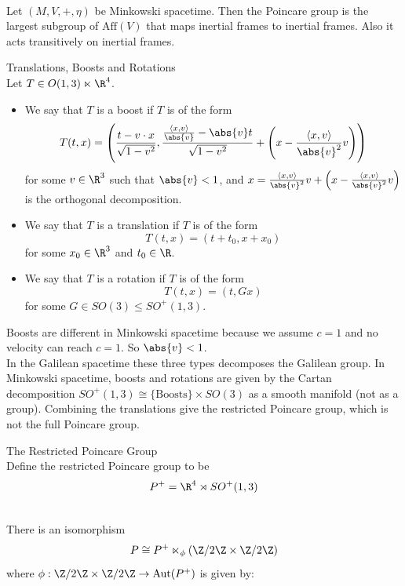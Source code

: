 \documentclass[a4paper]{article}
\begin{document}
\begin{prp}{}{}\\
Let $(M,V,+,\eta)$ be Minkowski spacetime. Then the Poincare group is the largest subgroup of $\text{Aff}(V)$ that maps inertial frames to inertial frames. Also it acts transitively on inertial frames. 
\end{prp}

\begin{defn}{Translations, Boosts and Rotations}{}\\
Let $T\in O(1,3)\ltimes\R^4$. 
\begin{itemize}
\item We say that $T$ is a boost if $T$ is of the form $$T(t,x)=\left(\frac{t-v\cdot x}{\sqrt{1-v^2}},\frac{\frac{\langle x,v\rangle}{\abs{v}}-\abs{v}t}{\sqrt{1-v^2}}+\left(x-\frac{\langle x,v\rangle}{\abs{v}^2}v\right)\right)$$ for some $v\in\R^3$ such that $\abs{v}<1$, and $x=\frac{\langle x,v\rangle}{\abs{v}^2}v+\left(x-\frac{\langle x,v\rangle}{\abs{v}^2}v\right)$ is the orthogonal decomposition. 
\item We say that $T$ is a translation if $T$ is of the form $$T(t,x)=(t+t_0,x+x_0)$$ for some $x_0\in\R^3$ and $t_0\in\R$. 
\item We say that $T$ is a rotation if $T$ is of the form $$T(t,x)=(t,Gx)$$ for some $G\in SO(3)\leq SO^+(1,3)$. 
\end{itemize}
\end{defn}

Boosts are different in Minkowski spacetime because we assume $c=1$ and no velocity can reach $c=1$. So $\abs{v}<1$. \\

In the Galilean spacetime these three types decomposes the Galilean group. In Minkowski spacetime, boosts and rotations are given by the Cartan decomposition $SO^+(1,3)\cong\{\text{Boosts}\}\times SO(3)$ as a smooth manifold (not as a group). Combining the translations give the restricted Poincare group, which is not the full Poincare group. 

\begin{defn}{The Restricted Poincare Group}{}\\
Define the restricted Poincare group to be $$P^+=\R^4\rtimes SO^+(1,3)$$
\end{defn}

\begin{prp}{}{}\\
There is an isomorphism $$P\cong P^+\ltimes_\phi(\Z/2\Z\times\Z/2\Z)$$ where $\phi:\Z/2\Z\times\Z/2\Z\to\text{Aut}(P^+)$ is given by: 
\end{prp}
\end{document}
